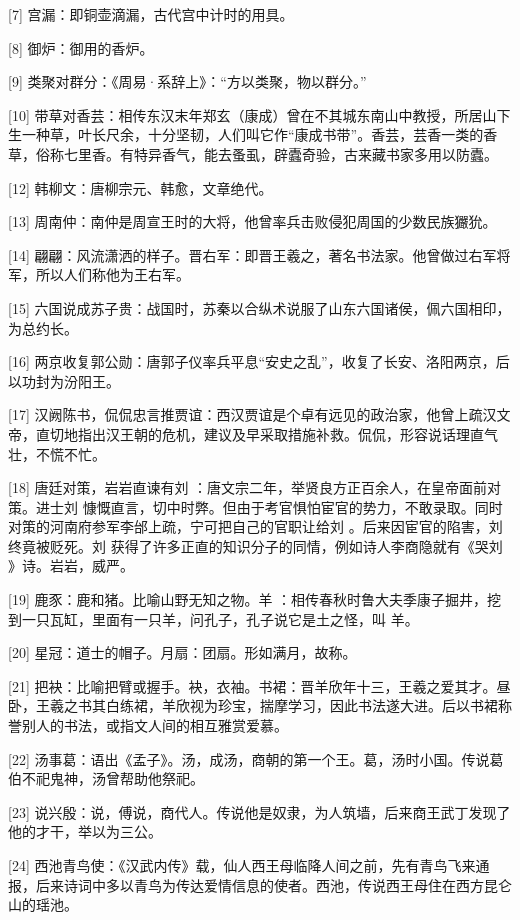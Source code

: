 \documentclass[12pt,UTF8]{ctexbook}
\begin{document}
[7] 宫漏：即铜壶滴漏，古代宫中计时的用具。

[8] 御炉：御用的香炉。

[9] 类聚对群分：《周易·系辞上》：“方以类聚，物以群分。”

[10] 带草对香芸：相传东汉末年郑玄（康成）曾在不其城东南山中教授，所居山下生一种草，叶长尺余，十分坚韧，人们叫它作“康成书带”。香芸，芸香一类的香草，俗称七里香。有特异香气，能去蚤虱，辟蠹奇验，古来藏书家多用以防蠹。

[12] 韩柳文：唐柳宗元、韩愈，文章绝代。

[13] 周南仲：南仲是周宣王时的大将，他曾率兵击败侵犯周国的少数民族玁狁。

[14] 翩翩：风流潇洒的样子。晋右军：即晋王羲之，著名书法家。他曾做过右军将军，所以人们称他为王右军。

[15] 六国说成苏子贵：战国时，苏秦以合纵术说服了山东六国诸侯，佩六国相印，为总约长。

[16] 两京收复郭公勋：唐郭子仪率兵平息“安史之乱”，收复了长安、洛阳两京，后以功封为汾阳王。

[17] 汉阙陈书，侃侃忠言推贾谊：西汉贾谊是个卓有远见的政治家，他曾上疏汉文帝，直切地指出汉王朝的危机，建议及早采取措施补救。侃侃，形容说话理直气壮，不慌不忙。

[18] 唐廷对策，岩岩直谏有刘 ：唐文宗二年，举贤良方正百余人，在皇帝面前对策。进士刘 慷慨直言，切中时弊。但由于考官惧怕宦官的势力，不敢录取。同时对策的河南府参军李邰上疏，宁可把自己的官职让给刘 。后来因宦官的陷害，刘 终竟被贬死。刘 获得了许多正直的知识分子的同情，例如诗人李商隐就有《哭刘 》诗。岩岩，威严。

[19] 鹿豕：鹿和猪。比喻山野无知之物。羊 ：相传春秋时鲁大夫季康子掘井，挖到一只瓦缸，里面有一只羊，问孔子，孔子说它是土之怪，叫 羊。

[20] 星冠：道士的帽子。月扇：团扇。形如满月，故称。

[21] 把袂：比喻把臂或握手。袂，衣袖。书裙：晋羊欣年十三，王羲之爱其才。昼卧，王羲之书其白练裙，羊欣视为珍宝，揣摩学习，因此书法遂大进。后以书裙称誉别人的书法，或指文人间的相互雅赏爱慕。

[22] 汤事葛：语出《孟子》。汤，成汤，商朝的第一个王。葛，汤时小国。传说葛伯不祀鬼神，汤曾帮助他祭祀。

[23] 说兴殷：说，傅说，商代人。传说他是奴隶，为人筑墙，后来商王武丁发现了他的才干，举以为三公。

[24] 西池青鸟使：《汉武内传》载，仙人西王母临降人间之前，先有青鸟飞来通报，后来诗词中多以青鸟为传达爱情信息的使者。西池，传说西王母住在西方昆仑山的瑶池。
\end{document}
